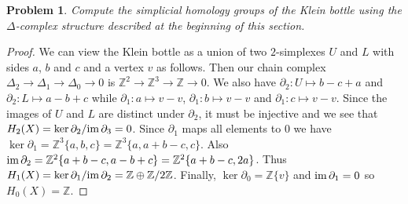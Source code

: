\documentclass{article}
\newcommand{\im}{\textup{im}\,}
\newtheorem{problem}{Problem}
\begin{document}
\begin{problem}
Compute the simplicial homology groups of the Klein bottle using the $\Delta$-complex structure described at the beginning of this section.
\end{problem}
\begin{proof}
We can view the Klein bottle as a union of two $2$-simplexes $U$ and $L$ with sides $a$, $b$ and $c$ and a vertex $v$ as follows.
\vspace{100pt}
Then our chain complex $\Delta_2 \to \Delta_1 \to \Delta_0 \to 0$ is $\mathbb{Z}^2 \to \mathbb{Z}^3 \to \mathbb{Z} \to 0$. We also have $\partial_2 : U \mapsto b - c + a$ and $\partial_2 : L \mapsto a - b + c$ while $\partial_1 : a \mapsto v-v$, $\partial_1 : b \mapsto v-v$ and $\partial_1 : c \mapsto v-v$. Since the images of $U$ and $L$ are distinct under $\partial_2$, it must be injective and we see that $H_2(X) = \ker \partial_2/\im \partial_3 = 0$. Since $\partial_1$ maps all elements to $0$ we have $\ker \partial_1 = \mathbb{Z}^3\{a,b,c\} = \mathbb{Z}^3\{a,a+b-c,c\}$. Also $\im \partial_2 = \mathbb{Z}^2\{a+b-c, a-b+c\} = \mathbb{Z}^2\{a+b-c,2a\}$. Thus $H_1(X) = \ker \partial_1/\im \partial_2 = \mathbb{Z} \oplus \mathbb{Z}/2\mathbb{Z}$. Finally, $\ker \partial_0 = \mathbb{Z}\{v\}$ and $\im \partial_1 = 0$ so $H_0(X) = \mathbb{Z}$.
\end{proof}
\end{document}
